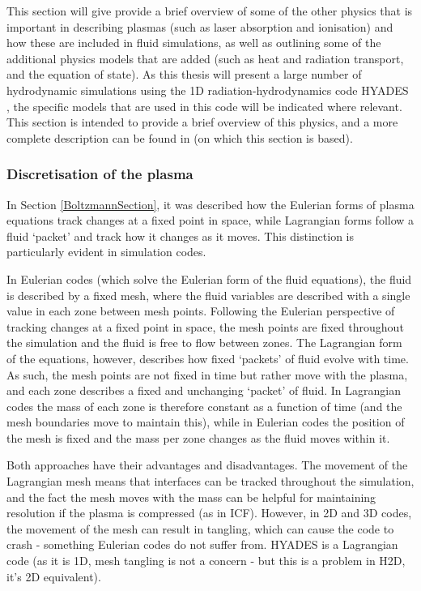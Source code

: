 This section will give provide a brief overview of some of the other physics that is important in describing plasmas (such as laser absorption and ionisation) and how these are included in fluid simulations, as well as outlining some of the additional physics models that are added (such as heat and radiation transport, and the equation of state). As this thesis will present a large number of hydrodynamic simulations using the 1D radiation-hydrodynamics code HYADES \cite{Larsen1994}, the specific models that are used in this code will be indicated where relevant. This section is intended to provide a brief overview of this physics, and a more complete description can be found in \cite{Colvin2013} (on which this section is based).

\subsubsection{Discretisation of the plasma}
In Section \ref{BoltzmannSection}, it was described how the Eulerian forms of plasma equations track changes at a fixed point in space, while Lagrangian forms follow a fluid `packet' and track how it changes as it moves. This distinction is particularly evident in simulation codes.

In Eulerian codes (which solve the Eulerian form of the fluid equations), the fluid is described by a fixed mesh, where the fluid variables are described with a single value in each zone between mesh points. Following the Eulerian perspective of tracking changes at a fixed point in space, the mesh points are fixed throughout the simulation and the fluid is free to flow between zones. The Lagrangian form of the equations, however, describes how fixed `packets' of fluid evolve with time. As such, the mesh points are not fixed in time but rather move with the plasma, and each zone describes a fixed and unchanging `packet' of fluid. In Lagrangian codes the mass of each zone is therefore constant as a function of time (and the mesh boundaries move to maintain this), while in Eulerian codes the position of the mesh is fixed and the mass per zone changes as the fluid moves within it.

Both approaches have their advantages and disadvantages. The movement of the Lagrangian mesh means that interfaces can be tracked throughout the simulation, and the fact the mesh moves with the mass can be helpful for maintaining resolution if the plasma is compressed (as in ICF). However, in 2D and 3D codes, the movement of the mesh can result in tangling, which can cause the code to crash - something Eulerian codes do not suffer from. HYADES is a Lagrangian code (as it is 1D, mesh tangling is not a concern - but this is a problem in H2D, it's 2D equivalent).

